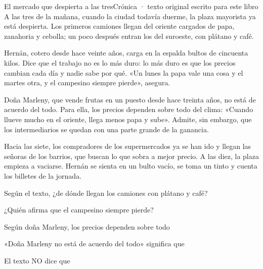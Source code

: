\evaluacion
\begin{texto}{El mercado que despierta a las tres}{Crónica · texto original escrito para este libro}
\pa A las tres de la mañana, cuando la ciudad todavía duerme, la plaza mayorista ya está despierta. Los primeros camiones
llegan del oriente cargados de papa, zanahoria y cebolla; un poco después entran los del suroeste, con plátano y café.

\pa Hernán, cotero desde hace veinte años, carga en la espalda bultos de cincuenta kilos. Dice que el trabajo no es lo
más duro: lo más duro es que los precios cambian cada día y nadie sabe por qué. «Un lunes la papa vale una cosa y el
martes otra, y el campesino siempre pierde», asegura.

\pa Doña Marleny, que vende frutas en un puesto desde hace treinta años, no está de acuerdo del todo. Para ella, los precios
dependen sobre todo del clima: «Cuando llueve mucho en el oriente, llega menos papa y sube». Admite, sin embargo, que los
intermediarios se quedan con una parte grande de la ganancia.

\pa Hacia las siete, los compradores de los supermercados ya se han ido y llegan las señoras de los barrios, que buscan
lo que sobra a mejor precio. A las diez, la plaza empieza a vaciarse. Hernán se sienta en un bulto vacío, se toma un
tinto y cuenta los billetes de la jornada.
\end{texto}
\begin{ejercicios}
\item Según el texto, ¿de dónde llegan los camiones con plátano y café?
\item ¿Quién afirma que el campesino siempre pierde?
\item Según doña Marleny, los precios dependen sobre todo
\item «Doña Marleny no está de acuerdo del todo»  significa que
\item El texto NO dice que
\end{ejercicios}
